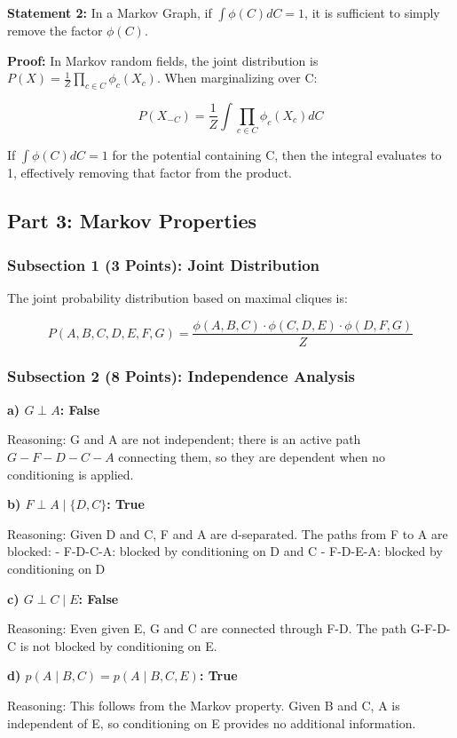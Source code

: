 \documentclass[conference]{IEEEtran}
\begin{document}
\textbf{Statement 2:} In a Markov Graph, if $\int \phi(C) dC = 1$, it is sufficient to simply remove the factor $\phi(C)$.

\textbf{Proof:} In Markov random fields, the joint distribution is $P(X) = \frac{1}{Z} \prod_{c \in C} \phi_c(X_c)$. When marginalizing over C:

\[P(X_{-C}) = \frac{1}{Z} \int \prod_{c \in C} \phi_c(X_c) dC\]

If $\int \phi(C) dC = 1$ for the potential containing C, then the integral evaluates to 1, effectively removing that factor from the product.

\subsection{Part 3: Markov Properties}

\subsubsection{Subsection 1 (3 Points): Joint Distribution}

The joint probability distribution based on maximal cliques is:

\[P(A,B,C,D,E,F,G) = \frac{\phi(A,B,C) \cdot \phi(C,D,E) \cdot \phi(D,F,G)}{Z}\]

\subsubsection{Subsection 2 (8 Points): Independence Analysis}

\textbf{a) $G \perp A$: False}

Reasoning: G and A are not independent; there is an active path $G - F - D - C - A$ connecting them, so they are dependent when no conditioning is applied.

\textbf{b) $F \perp A \mid \{D, C\}$: True}

Reasoning: Given D and C, F and A are d-separated. The paths from F to A are blocked:
- F-D-C-A: blocked by conditioning on D and C
- F-D-E-A: blocked by conditioning on D

\textbf{c) $G \perp C \mid E$: False}

Reasoning: Even given E, G and C are connected through F-D. The path G-F-D-C is not blocked by conditioning on E.

\textbf{d) $p(A \mid B, C) = p(A \mid B, C, E)$: True}

Reasoning: This follows from the Markov property. Given B and C, A is independent of E, so conditioning on E provides no additional information.
\end{document}
